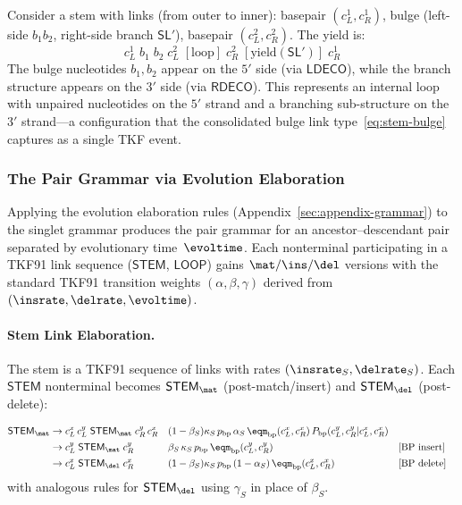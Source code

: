 \begin{remark}
Consider a stem with links (from outer to inner):
basepair $(c_L^1, c_R^1)$, bulge (left-side $b_1 b_2$,
right-side branch $\mathsf{SL}'$), basepair $(c_L^2, c_R^2)$.
The yield is:
\[
c_L^1\; b_1\; b_2\; c_L^2\; [\text{loop}]\;
c_R^2\; [\text{yield}(\mathsf{SL}')]\; c_R^1
\]
The bulge nucleotides $b_1, b_2$ appear on the $5'$ side
(via $\mathsf{LDECO}$), while the branch structure appears
on the $3'$ side (via $\mathsf{RDECO}$).
This represents an internal loop with unpaired nucleotides
on the $5'$ strand and a branching sub-structure on the $3'$
strand---a configuration that the consolidated bulge link
type~\eqref{eq:stem-bulge} captures as a single TKF event.
\end{remark}

\subsubsection{The Pair Grammar via Evolution Elaboration}
\label{sec:pair-grammar}

Applying the evolution elaboration rules
(Appendix~\ref{sec:appendix-grammar}) to the singlet grammar
produces the pair grammar for an ancestor--descendant pair
separated by evolutionary time~$\evoltime$.
Each nonterminal participating in a TKF91 link sequence
($\mathsf{STEM}$, $\mathsf{LOOP}$) gains $\mat/\ins/\del$
versions with the standard TKF91 transition weights
$(\alpha, \beta, \gamma)$ derived from $(\insrate, \delrate, \evoltime)$.

\paragraph{Stem Link Elaboration.}

The stem is a TKF91 sequence of links with rates
$(\insrate_S, \delrate_S)$.
Each $\mathsf{STEM}$ nonterminal becomes
$\mathsf{STEM}_\mat$ (post-match/insert) and
$\mathsf{STEM}_\del$ (post-delete):

\begin{align}
\mathsf{STEM}_\mat &\to c_L^x\, c_L^y\;\mathsf{STEM}_\mat\;c_R^y\, c_R^x
  && (1-\beta_S) \kappa_S\, p_{\mathrm{bp}}\, \alpha_S\,
     \eqm_{\mathrm{bp}}(c_L^x, c_R^x)\,
     P_{\mathrm{bp}}(c_L^y, c_R^y | c_L^x, c_R^x)
  \label{eq:pair-bp-match} \\
&\to c_L^y\;\mathsf{STEM}_\mat\;c_R^y
  && \beta_S\, \kappa_S\, p_{\mathrm{bp}}\,
     \eqm_{\mathrm{bp}}(c_L^y, c_R^y)
  && \text{[BP insert]}
  \label{eq:pair-bp-ins} \\
&\to c_L^x\;\mathsf{STEM}_\del\;c_R^x
  && (1-\beta_S) \kappa_S\, p_{\mathrm{bp}}\, (1-\alpha_S)\,
     \eqm_{\mathrm{bp}}(c_L^x, c_R^x)
  && \text{[BP delete]}
  \label{eq:pair-bp-del}
\end{align}
with analogous rules for $\mathsf{STEM}_\del$ using
$\gamma_S$ in place of $\beta_S$.

